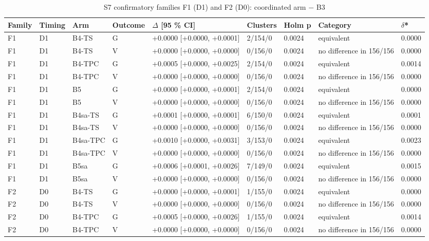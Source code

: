 \begin{table}[t]\centering\caption{S7 confirmatory families F1 (D1) and F2 (D0): coordinated arm $-$ B3}\label{tab:t2}\footnotesize
\begin{tabular}{lllllllll}\toprule
Family & Timing & Arm & Outcome & $\Delta$ [95 \% CI] & Clusters & Holm p & Category & $\delta$* \\\midrule
F1 & D1 & B4-TS & G & +0.0000 [+0.0000, +0.0001] & 2/154/0 & 0.0024 & equivalent & 0.0000 \\
F1 & D1 & B4-TS & V & +0.0000 [+0.0000, +0.0000] & 0/156/0 & 0.0024 & no difference in 156/156 & 0.0000 \\
F1 & D1 & B4-TPC & G & +0.0005 [+0.0000, +0.0025] & 2/154/0 & 0.0024 & equivalent & 0.0014 \\
F1 & D1 & B4-TPC & V & +0.0000 [+0.0000, +0.0000] & 0/156/0 & 0.0024 & no difference in 156/156 & 0.0000 \\
F1 & D1 & B5 & G & +0.0000 [+0.0000, +0.0001] & 2/154/0 & 0.0024 & equivalent & 0.0000 \\
F1 & D1 & B5 & V & +0.0000 [+0.0000, +0.0000] & 0/156/0 & 0.0024 & no difference in 156/156 & 0.0000 \\
F1 & D1 & B4sa-TS & G & +0.0001 [+0.0000, +0.0001] & 6/150/0 & 0.0024 & equivalent & 0.0001 \\
F1 & D1 & B4sa-TS & V & +0.0000 [+0.0000, +0.0000] & 0/156/0 & 0.0024 & no difference in 156/156 & 0.0000 \\
F1 & D1 & B4sa-TPC & G & +0.0010 [+0.0000, +0.0031] & 3/153/0 & 0.0024 & equivalent & 0.0023 \\
F1 & D1 & B4sa-TPC & V & +0.0000 [+0.0000, +0.0000] & 0/156/0 & 0.0024 & no difference in 156/156 & 0.0000 \\
F1 & D1 & B5sa & G & +0.0006 [+0.0001, +0.0026] & 7/149/0 & 0.0024 & equivalent & 0.0015 \\
F1 & D1 & B5sa & V & +0.0000 [+0.0000, +0.0000] & 0/156/0 & 0.0024 & no difference in 156/156 & 0.0000 \\
F2 & D0 & B4-TS & G & +0.0000 [+0.0000, +0.0001] & 1/155/0 & 0.0024 & equivalent & 0.0000 \\
F2 & D0 & B4-TS & V & +0.0000 [+0.0000, +0.0000] & 0/156/0 & 0.0024 & no difference in 156/156 & 0.0000 \\
F2 & D0 & B4-TPC & G & +0.0005 [+0.0000, +0.0026] & 1/155/0 & 0.0024 & equivalent & 0.0014 \\
F2 & D0 & B4-TPC & V & +0.0000 [+0.0000, +0.0000] & 0/156/0 & 0.0024 & no difference in 156/156 & 0.0000 \\

\end{tabular}
\end{table}
